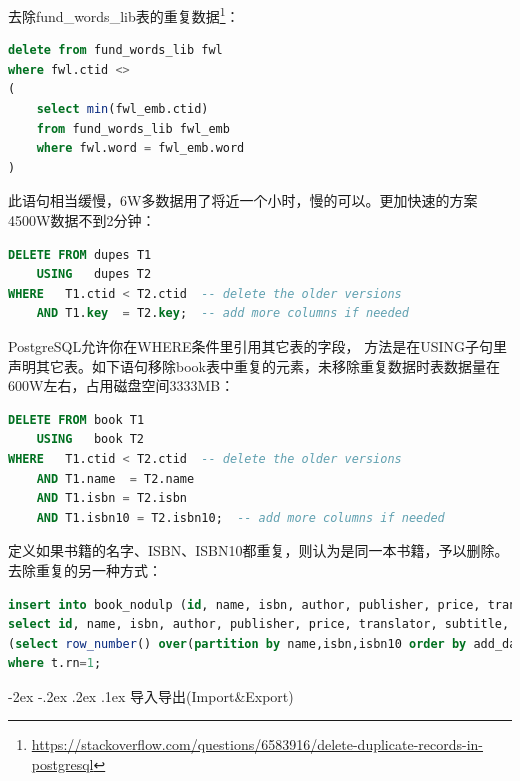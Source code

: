 \documentclass[8pt]{book}
\makeatletter
\numberwithin{dummy}{section}
\theoremstyle{ocrenumbox}
\theoremstyle{blacknumex}
\theoremstyle{blacknumbox}
\theoremstyle{ocrenum}
\renewcommand\paragraph{\@startsection{paragraph}{4}{\z@}
	{-2ex \@plus-.2ex \@minus .2ex}
	{.1ex}
	{\normalfont\small\sffamily\bfseries}}
\makeatother
\begin{document}
去除fund\_words\_lib表的重复数据\footnote{\url{https://stackoverflow.com/questions/6583916/delete-duplicate-records-in-postgresql}}：

\begin{lstlisting}[language=SQL]
delete from fund_words_lib fwl
where fwl.ctid <>
(
	select min(fwl_emb.ctid)
	from fund_words_lib fwl_emb
	where fwl.word = fwl_emb.word
)
\end{lstlisting}

此语句相当缓慢，6W多数据用了将近一个小时，慢的可以。更加快速的方案4500W数据不到2分钟：

\begin{lstlisting}[language=SQL]
DELETE FROM dupes T1
    USING   dupes T2
WHERE   T1.ctid < T2.ctid  -- delete the older versions
    AND T1.key  = T2.key;  -- add more columns if needed
\end{lstlisting}

PostgreSQL允许你在WHERE条件里引用其它表的字段， 方法是在USING子句里声明其它表。如下语句移除book表中重复的元素，未移除重复数据时表数据量在600W左右，占用磁盘空间3333MB：

\begin{lstlisting}[language=SQL]
DELETE FROM book T1
    USING   book T2
WHERE   T1.ctid < T2.ctid  -- delete the older versions
    AND T1.name  = T2.name
	AND T1.isbn = T2.isbn
	AND T1.isbn10 = T2.isbn10;  -- add more columns if needed
\end{lstlisting}

定义如果书籍的名字、ISBN、ISBN10都重复，则认为是同一本书籍，予以删除。去除重复的另一种方式：

\begin{lstlisting}[language=SQL]
insert into book_nodulp (id, name, isbn, author, publisher, price, translator, subtitle, publish_year, add_date, binding, douban_id, content_intro, original_name, author_intro, content, update_date, score, issuer, pages, isbn10, source, summary, creator, industry_identifiers, language, description, categories)  
select id, name, isbn, author, publisher, price, translator, subtitle, publish_year, add_date, binding, douban_id, content_intro, original_name, author_intro, content, update_date, score, issuer, pages, isbn10, source, summary, creator, industry_identifiers, language, description, categories from   
(select row_number() over(partition by name,isbn,isbn10 order by add_date desc ) as rn, * from book_backup_500w) t  
where t.rn=1;
\end{lstlisting}


\paragraph{导入导出(Import\&Export)}
\end{document}
